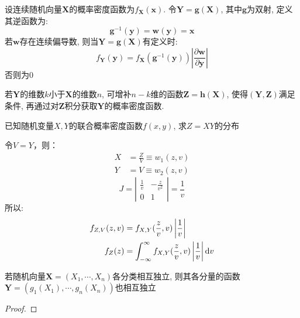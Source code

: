\begin{theorem}[多变量函数的概率函数变换]
    设连续随机向量$\mathbf{X}$的概率密度函数为$f_\mathbf{X}(\mathbf{x})$. 令$\mathbf{Y}=\mathbf{g}(\mathbf{X})$, 其中$\mathbf{g}$为双射, 定义其逆函数为:
    \[ \mathbf{g}^{-1}(\mathbf{y})=\mathbf{w}(\mathbf{y})=\mathbf{x} \]
    若$\mathbf{w}$存在连续偏导数, 则当$\mathbf{Y}=\mathbf{g}(\mathbf{X})$有定义时:
    \[ f_\mathbf{Y}(\mathbf{y})=f_\mathbf{X}(\mathbf{g}^{-1}(\mathbf{y}))\left| \frac{\partial \mathbf{w}}{\partial \mathbf{y}} \right|  \]
    否则为$0$
\end{theorem}

\begin{remark}
    若$\mathbf{Y}$的维数$k$小于$\mathbf{X}$的维数$n$, 可增补$n-k$维的函数$\mathbf{Z}=\mathbf{h}(\mathbf{X})$, 使得$(\mathbf{Y},\mathbf{Z})$满足条件, 再通过对$\mathbf{Z}$积分获取$\mathbf{Y}$的概率密度函数.
\end{remark}

\begin{example}[连续变量之积]\label{ex:product_of_variable}
    已知随机变量$X,Y$的联合概率密度函数$f(x,y)$, 求$Z=XY$的分布
\end{example}
\begin{solution}
    令$V=Y$，则：
    \begin{align*}
        X & = \frac{Z}{V} \equiv w_{1}(z, v) \\
        Y & = V \equiv w_{2}(z, v)
    \end{align*}
    \[ J=\left|\begin{array}{cc}\frac{1}{v} & -\frac{z}{v^2} \\ 0 & 1 \end{array}\right|=\frac{1}{v}\]
    所以:
    \begin{align*}
        f_{Z,V}(z, v) & = f_{X,Y}(\frac{z}{v},v)\left| \frac{1}{v} \right|                              \\
        f_{Z}(z)      & = \int_{-\infty}^{\infty} f_{X,Y}(\frac{z}{v},v)\left| \frac{1}{v} \right| \mathrm{d} v
    \end{align*}
\end{solution}

\begin{proposition}
    若随机向量$\mathbf{X}=(X_1,\cdots ,X_n)$各分类相互独立, 则其各分量的函数$\mathbf{Y}=(g_1(X_1),\cdots ,g_n(X_n))$也相互独立
\end{proposition}
\begin{proof}

\end{proof}

